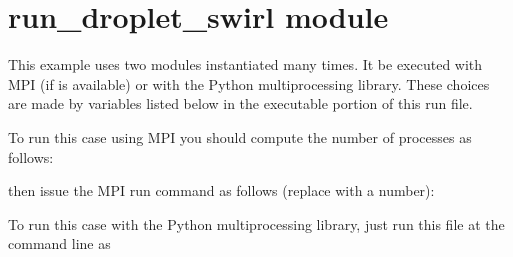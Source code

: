 \documentclass[letterpaper,10pt,openany,oneside,english]{sphinxmanual}
\begin{document}
\section{run\_droplet\_swirl module}
\label{\detokenize{examples_rst/run_droplet_swirl:module-run_droplet_swirl}}\label{\detokenize{examples_rst/run_droplet_swirl:run-droplet-swirl-module}}\label{\detokenize{examples_rst/run_droplet_swirl::doc}}
This example uses two modules instantiated many times. It be executed with MPI
(if  is available) or with the Python multiprocessing library. These choices
are made by variables listed below in the executable portion of this run file.

To run this case using MPI you should compute the number of
processes as follows:
\begin{quote}

\end{quote}

then issue the MPI run command as follows (replace  with a number):
\begin{quote}

\end{quote}

To run this case with the Python multiprocessing library, just run this file at the
command line as
\begin{quote}

\end{quote}
\end{document}

